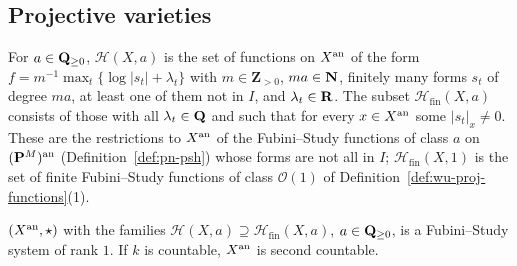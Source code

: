 \subsection{Projective varieties}\label{subsec:pg-subvariety}

\begin{definition}\label{def:pg-subvariety-fs}
\leanok
{}
For $a\in\mathbf{Q}_{\ge0}$, $\mathcal H(X,a)$ is the set of functions on $X^{\mathrm{an}}$ of the form
$f=m^{-1}\max_t\{\log|s_t|+\lambda_t\}$ with $m\in\mathbf Z_{>0}$, $ma\in\mathbf{N}$, finitely many forms $s_t$ of degree $ma$, at least
one of them not in $I$, and $\lambda_t\in\mathbf{R}$. The subset $\mathcal H_{\mathrm{fin}}(X,a)$ consists of those with all $\lambda_t\in\mathbf{Q}$
and such that for every $x\in X^{\mathrm{an}}$ some $|s_t|_x\ne0$. These are the restrictions to $X^{\mathrm{an}}$ of the Fubini--Study functions of
class $a$ on $(\mathbf{P}^M)^{\mathrm{an}}$ (Definition~\ref{def:pn-psh}) whose forms are not all in $I$; $\mathcal H_{\mathrm{fin}}(X,1)$ is the set of
finite Fubini--Study functions of class $\mathcal O(1)$ of Definition~\ref{def:wu-proj-functions}(1).
\end{definition}

\begin{lemma}\label{lem:pg-subvariety-fs-system}
\leanok
{}
$(X^{\mathrm{an}},\star)$ with the families $\mathcal H(X,a)\supseteq\mathcal H_{\mathrm{fin}}(X,a)$, $a\in\mathbf{Q}_{\ge0}$, is a Fubini--Study system of
rank $1$. If $k$ is countable, $X^{\mathrm{an}}$ is second countable.
\end{lemma}

